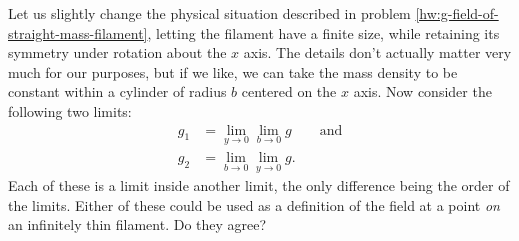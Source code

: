 Let us slightly change the physical situation described in problem \ref{hw:g-field-of-straight-mass-filament},
letting the filament have a finite size, while retaining its symmetry under rotation about the $x$ axis. The
details don't actually matter very much for our purposes, but if we like, we can take the mass density to
be constant within a cylinder of radius $b$ centered on the $x$ axis. Now consider the following two
limits:
\begin{align*}
  g_1 &= \lim_{y\rightarrow0} \lim_{b\rightarrow0} g \qquad \text{and}\\
  g_2 &= \lim_{b\rightarrow0} \lim_{y\rightarrow0} g. 
\end{align*}
Each of these is a limit inside another limit, the only difference being the order of the limits.
Either of these could be used as a definition of the field at a point \emph{on} an infinitely
thin filament. Do they agree?
